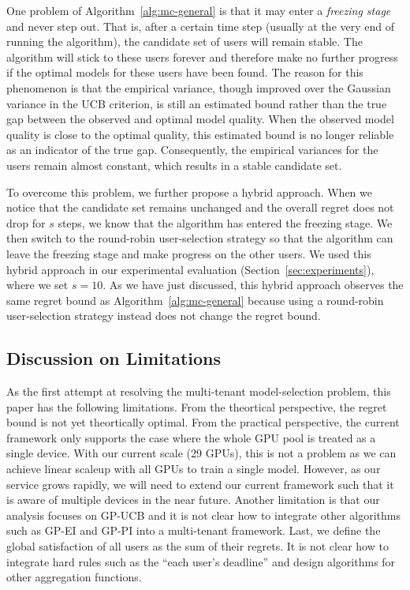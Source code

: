 \documentclass[letterpaper]{vldb}
\begin{document}
One problem of Algorithm~\ref{alg:mc-general} is that it may enter a \emph{freezing stage} and never step out.
That is, after a certain time step (usually at the very end of running the algorithm), the candidate set of users will remain stable.
The algorithm will stick to these users forever and therefore make no further progress if the optimal models for these users have been found.
The reason for this phenomenon is that the empirical variance, though improved over the Gaussian variance in the UCB criterion, is still an estimated bound rather than the true gap between the observed and optimal model quality.
When the observed model quality is close to the optimal quality, this estimated bound is no longer reliable as an indicator of the true gap.
Consequently, the empirical variances for the users remain almost constant, which results in a stable candidate set.

To overcome this problem, we further propose a hybrid approach.
When we notice that the candidate set remains unchanged and the overall regret does not drop for $s$ steps,
we know that the algorithm has entered the freezing stage.
We then switch to the round-robin user-selection strategy so that the algorithm can leave the freezing stage and make progress on the other users.
We used this hybrid approach in our experimental evaluation (Section~\ref{sec:experiments}), where we set $s=10$.
As we have just discussed, this hybrid approach observes the same regret bound as Algorithm~\ref{alg:mc-general} because using a round-robin user-selection strategy instead does not change the regret bound.

\vspace{0.5em}
\subsection{Discussion on Limitations} \label{sec:limitations}

As the first attempt
at resolving the multi-tenant model-selection problem,
this paper has the following limitations.
From the theortical perspective, the regret bound
is not yet theortically optimal.
From the practical perspective,
the current framework only supports the case where
the whole GPU pool is treated as a single device.
With our current scale (29 GPUs), this is not
a problem as we can achieve linear scaleup
with all GPUs to train a single model. However, as our service grows
rapidly, we will need to extend our current framework
such that it is aware of multiple devices in the near future.
Another limitation is that our
analysis focuses on GP-UCB and it is not clear
how to integrate other algorithms such as
GP-EI and GP-PI into a multi-tenant 
framework. Last, we define the global
satisfaction of all users as the sum 
of their regrets. It is not clear how to
integrate hard rules such as the ``each user's deadline'' 
and design
algorithms for other aggregation functions.
\end{document}
